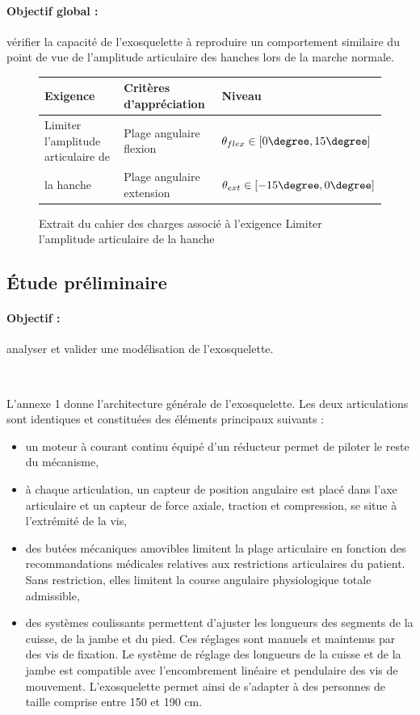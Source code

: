 \paragraph{Objectif global :} vérifier la capacité de l'exosquelette à reproduire un comportement similaire du
point de vue de l'amplitude articulaire des hanches lors de la marche normale.

\begin{figure}[ht!]
\begin{tabular}{|m{}|m{}|m{}|}\hline
Exigence & Critères d'appréciation & Niveau \\
\hline
Limiter l'amplitude articulaire de & Plage angulaire flexion & $\theta_{flex}\in\left[0\degree,15\degree\right]$\\
la hanche & Plage angulaire extension & $\theta_{ext}\in\left[-15\degree,0\degree\right]$\\
\hline
\end{tabular}
\caption{\label{fig03} Extrait du cahier des charges associé à l'exigence
\og Limiter l'amplitude articulaire de la hanche \fg}
\end{figure}

\subsection{Étude préliminaire}

\paragraph{Objectif :} analyser et valider une modélisation de l'exosquelette.

~\

L'annexe 1 donne l'architecture générale de l'exosquelette. Les deux articulations sont identiques et constituées des éléments principaux suivants :
\begin{itemize}
 \item un moteur à courant continu équipé d'un réducteur permet de piloter le reste du mécanisme,
 \item à chaque articulation, un capteur de position angulaire est placé dans l'axe articulaire et un capteur de force axiale, traction et compression, se situe à l'extrémité de la vis,
 \item des butées mécaniques amovibles limitent la plage articulaire en fonction des recommandations médicales relatives aux restrictions articulaires du patient. Sans restriction, elles limitent la course angulaire physiologique totale admissible,
 \item des systèmes coulissants permettent d'ajuster les longueurs des segments de la cuisse, de la jambe et du pied. Ces réglages sont manuels et maintenus par des vis de fixation. Le système de réglage des longueurs de la cuisse et de la jambe est compatible avec l'encombrement linéaire et pendulaire des vis de mouvement. L'exosquelette permet ainsi de s'adapter à des personnes de taille comprise entre 150 et 190 cm.
\end{itemize}

